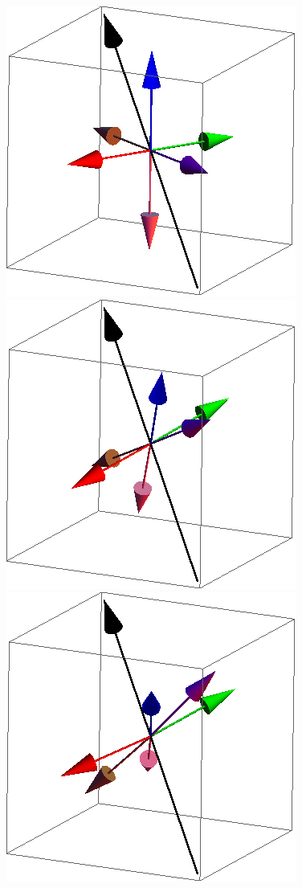 \documentclass{article}
\begin{document}
\begin{figure}[ht]
\centering
\includegraphics[scale=0.27]{111_2000/1S000to005R.png}
\includegraphics[scale=0.27]{111_2000/2S000to005R.png}
\includegraphics[scale=0.27]{111_2000/3S000to005R.png}

\end{figure}
\end{document}
